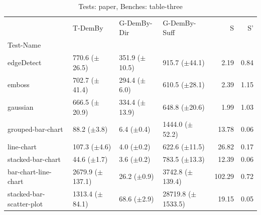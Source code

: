 \begin{table}
\caption{Tests: paper, Benches: table-three}
\label{paper-table-three}
\begin{tabular}{llllrr}
\toprule
 & T-DemBy & G-DemBy-Dir & G-DemBy-Suff & S & S' \\
Test-Name &  &  &  &  &  \\
\midrule
edgeDetect & 770.6 ($\pm$26.5) & 351.9 ($\pm$10.5) & 915.7 ($\pm$44.1) & 2.19 & 0.84 \\
emboss & 702.7 ($\pm$41.4) & 294.4 ($\pm$6.0) & 610.5 ($\pm$28.1) & 2.39 & 1.15 \\
gaussian & 666.5 ($\pm$20.9) & 334.4 ($\pm$13.9) & 648.8 ($\pm$20.6) & 1.99 & 1.03 \\
grouped-bar-chart & 88.2 ($\pm$3.8) & 6.4 ($\pm$0.4) & 1444.0 ($\pm$52.2) & 13.78 & 0.06 \\
line-chart & 107.3 ($\pm$4.6) & 4.0 ($\pm$0.2) & 622.6 ($\pm$11.5) & 26.82 & 0.17 \\
stacked-bar-chart & 44.6 ($\pm$1.7) & 3.6 ($\pm$0.2) & 783.5 ($\pm$13.3) & 12.39 & 0.06 \\
bar-chart-line-chart & 2679.9 ($\pm$137.1) & 26.2 ($\pm$0.9) & 3742.8 ($\pm$139.4) & 102.29 & 0.72 \\
stacked-bar-scatter-plot & 1313.4 ($\pm$84.1) & 68.6 ($\pm$2.9) & 28719.8 ($\pm$1533.5) & 19.15 & 0.05 \\
\bottomrule
\end{tabular}
\end{table}
